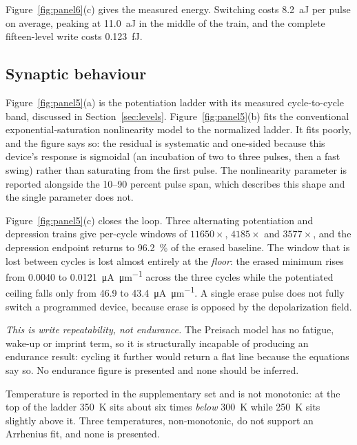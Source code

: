 Figure~\ref{fig:panel6}(c) gives the measured energy. Switching costs \SI{8.2}{\atto\joule} per pulse on
average, peaking at \SI{11.0}{\atto\joule} in the middle of the train, and the complete
fifteen-level write costs \SI{0.123}{\femto\joule}.

\subsection{Synaptic behaviour}

Figure~\ref{fig:panel5}(a) is the potentiation ladder with its measured cycle-to-cycle band, discussed in
Section~\ref{sec:levels}. Figure~\ref{fig:panel5}(b) fits the conventional exponential-saturation
nonlinearity model to the normalized ladder. It fits poorly, and the figure says so: the
residual is systematic and one-sided because this device's response is sigmoidal (an
incubation of two to three pulses, then a fast swing) rather than saturating from the
first pulse. The nonlinearity parameter is reported alongside the \numrange{10}{90}
percent pulse span, which describes this shape and the single parameter does not.

Figure~\ref{fig:panel5}(c) closes the loop. Three alternating potentiation and depression trains give
per-cycle windows of $11650\times$, $4185\times$ and $3577\times$, and the depression
endpoint returns to \SI{96.2}{\percent} of the erased baseline. The window that is lost
between cycles is lost almost entirely at the \emph{floor}: the erased minimum rises from
\num{0.0040} to \SI{0.0121}{\micro\ampere\per\micro\metre} across the three cycles while
the potentiated ceiling falls only from \num{46.9} to
\SI{43.4}{\micro\ampere\per\micro\metre}. A single erase pulse does not fully switch a
programmed device, because erase is opposed by the depolarization field.

\emph{This is write repeatability, not endurance.} The Preisach model has no fatigue,
wake-up or imprint term, so it is structurally incapable of producing an endurance
result: cycling it further would return a flat line because the equations say so. No
endurance figure is presented and none should be inferred.

Temperature is reported in the supplementary set and is not monotonic: at the top of the
ladder \SI{350}{\kelvin} sits about six times \emph{below} \SI{300}{\kelvin} while
\SI{250}{\kelvin} sits slightly above it. Three temperatures, non-monotonic, do not
support an Arrhenius fit, and none is presented.

